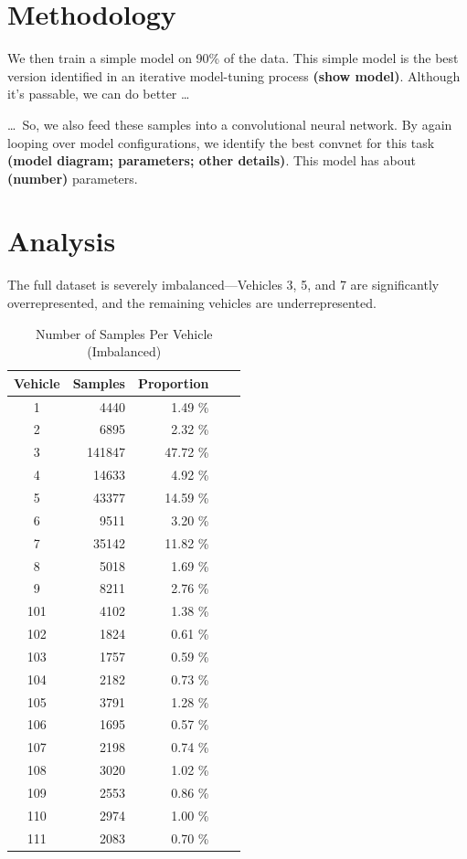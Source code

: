 \documentclass[10pt]{article}
\newcommand{\newpar}{\medskip \noindent}
\begin{document}
\section{Methodology}

\newpar We then train a simple model on 90\% of the data. This simple model is the best version identified in an iterative model-tuning process \textbf{(show model)}. Although it's passable, we can do better \ldots

\newpar \ldots\ So, we also feed these samples into a convolutional neural network. By again looping over model configurations, we identify the best convnet for this task \textbf{(model diagram; parameters; other details)}. This model has about \textbf{(number)} parameters.

\section{Analysis}

\newpar The full dataset is severely imbalanced---Vehicles 3, 5, and 7 are significantly overrepresented, and the remaining vehicles are underrepresented.

\begin{table}
    \caption*{Number of Samples Per Vehicle (Imbalanced)}
    \centering
    \begin{tabular}{|c|r|r|r|r|}
    \hline
    \textbf{Vehicle} & \textbf{Samples} & \textbf{Proportion} \\
    \hline
    1   & 4440   & 1.49  \% \\
    2   & 6895   & 2.32  \% \\
    3   & 141847 & 47.72 \% \\
    4   & 14633  & 4.92  \% \\
    5   & 43377  & 14.59 \% \\
    6   & 9511   & 3.20  \% \\
    7   & 35142  & 11.82 \% \\
    8   & 5018   & 1.69  \% \\
    9   & 8211   & 2.76  \% \\
    101 & 4102   & 1.38  \% \\
    102 & 1824   & 0.61  \% \\
    103 & 1757   & 0.59  \% \\
    104 & 2182   & 0.73  \% \\
    105 & 3791   & 1.28  \% \\
    106 & 1695   & 0.57  \% \\
    107 & 2198   & 0.74  \% \\
    108 & 3020   & 1.02  \% \\
    109 & 2553   & 0.86  \% \\
    110 & 2974   & 1.00  \% \\
    111 & 2083   & 0.70  \% \\
    \hline
    \end{tabular}
\end{table}
\end{document}

